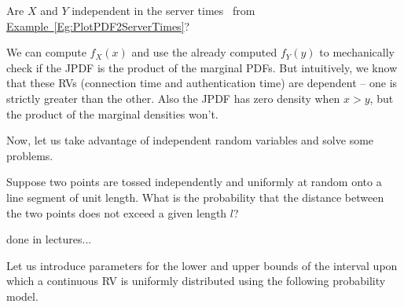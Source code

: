 Are $X$ and $Y$ independent in the server times \rv~from \hyperref[Eg:PlotPDF2ServerTimes]{Example~\ref*{Eg:PlotPDF2ServerTimes}}?

We can compute $f_X(x)$ and use the already computed $f_Y(y)$ to mechanically check if the JPDF is the product of the marginal PDFs.  But intuitively, we know that these RVs (connection time and authentication time) are dependent -- one is strictly greater than the other.  
Also the JPDF has zero density when $x>y$, but the product of the marginal densities won't.

Now, let us take advantage of independent random variables and solve some problems.

\begin{example}
Suppose two points are tossed independently and uniformly at random onto a line segment of unit length.  
What is the probability that the distance between the two points does not exceed a given length $l$? 

\vspace{5cm}
done in lectures...

\end{example}

Let us introduce parameters for the lower and upper bounds of the interval upon which a continuous RV is uniformly distributed using the following probability model.
 
